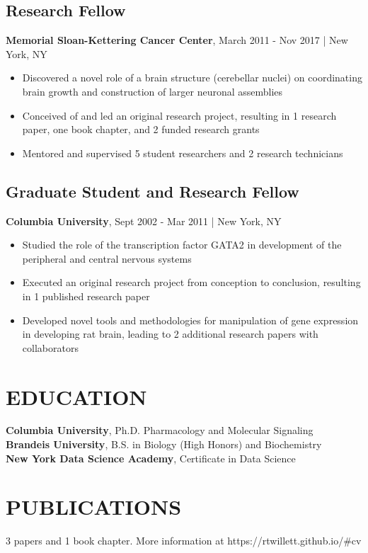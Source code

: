 \documentclass[11pt]{article}
\newenvironment{myitemize}
{ \begin{itemize}
	\setlength{\itemsep}{0pt}
	\setlength{\parskip}{0pt}
	\setlength{\parsep}{0pt}     }
{ \end{itemize}                  }
\begin{document}
\subsection*{Research Fellow}
{\bfseries Memorial Sloan-Kettering Cancer Center}, March 2011 - Nov 2017 | New York, NY
\begin{myitemize}
	\item Discovered a novel role of a brain structure (cerebellar nuclei) on coordinating brain growth and construction of larger neuronal assemblies
	\item Conceived of and led an original research project, resulting in 1 research paper, one book chapter, and 2 funded research grants
	\item Mentored and supervised 5 student researchers and 2 research technicians
\end{myitemize}

\subsection*{Graduate Student and Research Fellow}
{\bfseries Columbia University}, Sept 2002 - Mar 2011 | New York, NY
\begin{myitemize}
	\item Studied the role of the transcription factor GATA2 in development of the peripheral and central nervous systems
	\item Executed an original research project from conception to conclusion, resulting in 1 published research paper
	\item Developed novel tools and methodologies for manipulation of gene expression in developing rat brain, leading to 2 additional research papers with collaborators
\end{myitemize}

\section*{EDUCATION}
{\bfseries Columbia University}, Ph.D. Pharmacology and Molecular Signaling \\
{\bfseries Brandeis University}, B.S. in Biology (High Honors) and Biochemistry \\
{\bfseries New York Data Science Academy}, Certificate in Data Science

\section*{PUBLICATIONS}
3 papers and 1 book chapter. More information at https://rtwillett.github.io/\#cv
\end{document}

